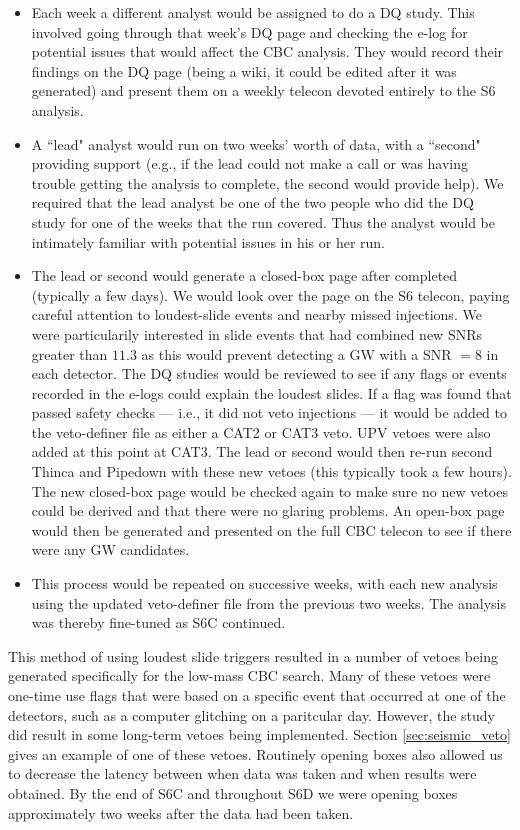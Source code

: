 \begin{itemize}
\item{Each week a different analyst would be assigned to do a \ac{DQ} study. This involved going through that week's DQ page and checking the e-log for potential issues that would affect the \ac{CBC} analysis. They would record their findings on the DQ page (being a wiki, it could be edited after it was generated) and present them on a weekly telecon devoted entirely to the S6 analysis.}
\item{A ``lead" analyst would run \ihope on two weeks' worth of data, with a ``second" providing support (e.g., if the lead could not make a call or was having trouble getting the analysis to complete, the second would provide help). We required that the lead analyst be one of the two people who did the DQ study for one of the weeks that the \ihope run covered. Thus the analyst would be intimately familiar with potential issues in his or her run.}
\item{The lead or second would generate a closed-box \ihope page after \ihope completed (typically a few days). We would look over the page on the S6 telecon, paying careful attention to loudest-slide events and nearby missed injections. We were particularily interested in slide events that had combined new \acp{SNR} greater than $11.3$ as this would prevent detecting a \ac{GW} with a \ac{SNR} $= 8$ in each detector. The DQ studies would be reviewed to see if any flags or events recorded in the e-logs could explain the loudest slides. If a flag was found that passed safety checks --- i.e., it did not veto injections --- it would be added to the veto-definer file as either a CAT2 or CAT3 veto. UPV vetoes were also added at this point at CAT3. The lead or second would then re-run second Thinca and Pipedown with these new vetoes (this typically took a few hours). The new closed-box page would be checked again to make sure no new vetoes could be derived and that there were no glaring problems. An open-box page would then be generated and presented on the full \ac{CBC} telecon to see if there were any \ac{GW} candidates.}
\item{This process would be repeated on successive weeks, with each new analysis using the updated veto-definer file from the previous two weeks. The analysis was thereby fine-tuned as S6C continued.}
\end{itemize}

This method of using loudest slide triggers resulted in a number of vetoes being generated specifically for the low-mass \ac{CBC} search. Many of these vetoes were one-time use flags that were based on a specific event that occurred at one of the detectors, such as a computer glitching on a paritcular day. However, the study did result in some long-term vetoes being implemented. Section \ref{sec:seismic_veto} gives an example of one of these vetoes. Routinely opening boxes also allowed us to decrease the latency between when data was taken and when results were obtained. By the end of S6C and throughout S6D we were opening boxes approximately two weeks after the data had been taken. 

